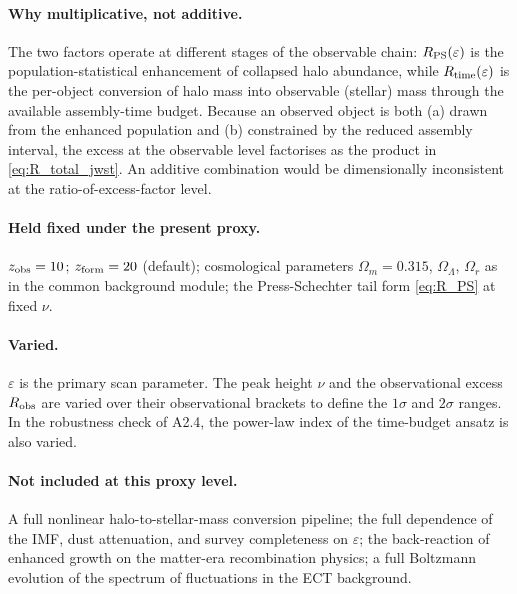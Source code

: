 \paragraph{Why multiplicative, not additive.} The two factors
operate at different stages of the observable chain:
$R_{\rm PS}(\varepsilon)$ is the population-statistical enhancement
of collapsed halo abundance, while $R_{\rm time}(\varepsilon)$ is
the per-object conversion of halo mass into observable
(stellar) mass through the available assembly-time budget.
Because an observed object is both (a) drawn from the enhanced
population and (b) constrained by the reduced assembly interval,
the excess at the observable level factorises as the product in
\eqref{eq:R_total_jwst}. An additive combination would be
dimensionally inconsistent at the ratio-of-excess-factor level.


\paragraph{Held fixed under the present proxy.} $z_{\rm obs} = 10$;
$z_{\rm form} = 20$ (default); cosmological parameters
$\Omega_m = 0.315$, $\Omega_\Lambda$, $\Omega_r$ as in the common
background module; the Press-Schechter tail form
\eqref{eq:R_PS} at fixed $\nu$.

\paragraph{Varied.}
$\varepsilon$ is the primary scan parameter. The peak height $\nu$
and the observational excess $R_{\rm obs}$ are varied over their
observational brackets to define the $1\sigma$ and $2\sigma$
ranges. In the robustness check of A2.4, the power-law index of
the time-budget ansatz is also varied.

\paragraph{Not included at this proxy level.}
A full nonlinear halo-to-stellar-mass conversion pipeline; the
full dependence of the IMF, dust attenuation, and survey
completeness on $\varepsilon$; the back-reaction of enhanced
growth on the matter-era recombination physics; a full Boltzmann
evolution of the spectrum of fluctuations in the ECT background.

